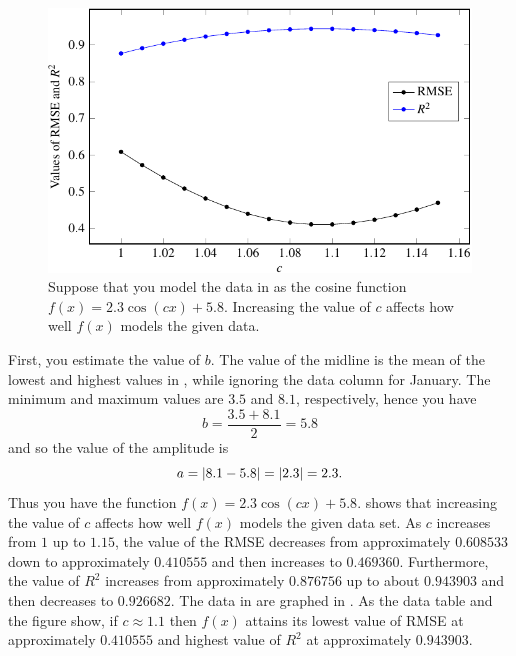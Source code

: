 \documentclass[a4paper,oneside,12pt]{article}
\begin{document}
\begin{problem}
{\begin{solution}
\begin{table}[!htbp]
\centering

\caption{%
  Consider the function $f(x) = 2.3 \cos(cx) + 5.8$.  Increasing the
  value of $c$ has the effect of changing the values of the root mean
  square error~(RMSE) and the coefficient of determination of $f(x)$.
}
\label{tab:trigonometric:mean_daily_sunshine_vary_c_ignore_highest}
\end{table}

\begin{figure}[!htbp]
\centering
\includegraphics[scale=1.1]{image/13/sunshine-vary-c-ignore-highest.pdf}
\caption{%
  Suppose that you model the data in
   as the cosine function
  $f(x) = 2.3 \cos(cx) + 5.8$.  Increasing the value of $c$ affects
  how well $f(x)$ models the given data.
}
\label{fig:trigonometric:mean_daily_sunshine_vary_c_ignore_highest}
\end{figure}

First, you estimate the value of $b$.  The value of the midline is the
mean of the lowest and highest values in
, while ignoring the data
column for January.  The minimum and maximum values are $3.5$ and
$8.1$, respectively, hence you have
\[
b
=
\frac{3.5 + 8.1}{2}
=
5.8
\]
and so the value of the amplitude is
\[
a
=
\lvert8.1 - 5.8\rvert
=
\lvert2.3\rvert
=
2.3.
\]
Thus you have the function $f(x) = 2.3 \cos(cx) + 5.8$.
shows that increasing the value of $c$ affects how well $f(x)$ models
the given data set.  As $c$ increases from $1$ up to $1.15$, the value
of the RMSE decreases from approximately $0.608533$ down to
approximately $0.410555$ and then increases to $0.469360$.
Furthermore, the value of $R^2$ increases from approximately
$0.876756$ up to about $0.943903$ and then decreases to $0.926682$.
The data in
are graphed in
.
As the data table and the figure show, if $c \approx 1.1$ then $f(x)$
attains its lowest value of RMSE at approximately $0.410555$ and
highest value of $R^2$ at approximately $0.943903$.


\end{solution}}
\end{problem}
\end{document}
